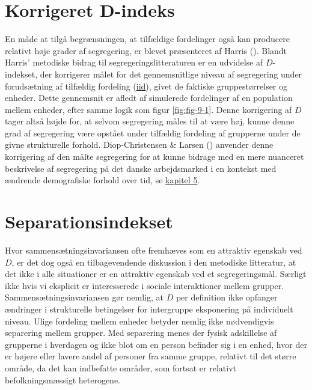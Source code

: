 \documentclass[
]{book}
\begin{document}
\section{Korrigeret D-indeks}\label{korrigeret-d-indeks}

En måde at tilgå begrænsningen, at tilfældige fordelinger også kan producere relativt høje grader af segregering, er blevet præsenteret af Harris (). Blandt Harris' metodiske bidrag til segregeringslitteraturen er en udvidelse af \(D\)-indekset, der korrigerer målet for det gennemsnitlige niveau af segregering under forudsætning af tilfældig fordeling (\href{https://en.wikipedia.org/wiki/Independent_and_identically_distributed_random_variables}{iid}), givet de faktiske gruppestørrelser og enheder. Dette gennemsnit er afledt af simulerede fordelinger af en population mellem enheder, efter samme logik som figur \ref{fig:fig-9-1}. Denne korrigering af \(D\) tager altså højde for, at selvom segregering måles til at være høj, kunne denne grad af segregering være opstået under tilfældig fordeling af grupperne under de givne strukturelle forhold. Diop-Christensen \& Larsen () anvender denne korrigering af den målte segregering for at kunne bidrage med en mere nuanceret beskrivelse af segregering på det danske arbejdsmarked i en kontekst med ændrende demografiske forhold over tid, se \hyperref[kap5]{kapitel 5}.

\section{Separationsindekset}\label{separationsindekset}

Hvor sammensætningsinvariansen ofte fremhæves som en attraktiv egenskab ved \(D\), er det dog også en tilbagevendende diskussion i den metodiske litteratur, at det ikke i alle situationer er en attraktiv egenskab ved et segregeringsmål. Særligt ikke hvis vi eksplicit er interesserede i sociale interaktioner mellem grupper. Sammensætningsinvariansen gør nemlig, at \(D\) per definition ikke opfanger ændringer i strukturelle betingelser for intergruppe eksponering på individuelt niveau. Ulige fordeling mellem enheder betyder nemlig ikke nødvendigvis separering mellem grupper. Med separering menes der fysisk adskillelse af grupperne i hverdagen og ikke blot om en person befinder sig i en enhed, hvor der er højere eller lavere andel af personer fra samme gruppe, relativt til det større område, da det kan indbefatte områder, som fortsat er relativt befolkningsmæssigt heterogene.
\end{document}
